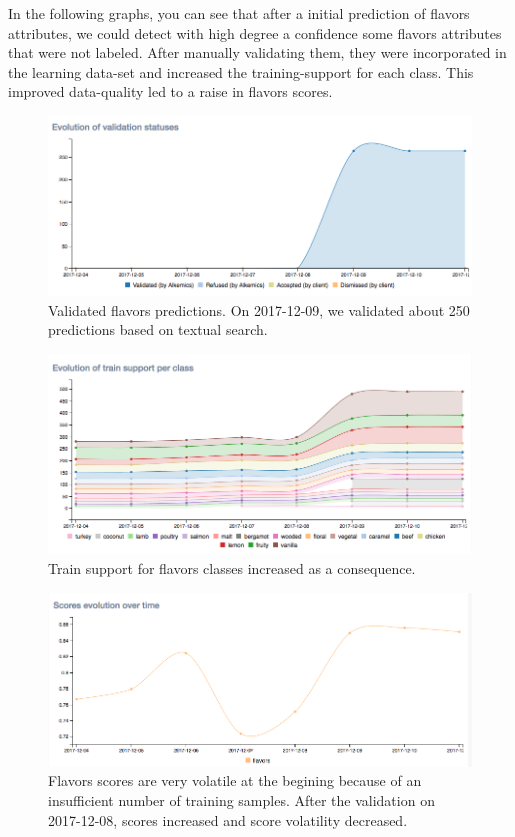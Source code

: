 In the following graphs, you can see that after a initial prediction of flavors attributes, we could detect with high degree a confidence some flavors attributes that were not labeled. After manually validating them, they were incorporated in the learning data-set and increased the training-support for each class. This improved data-quality led to a raise in flavors scores.

\begin{figure}[H]
\centering
\includegraphics[scale=0.5]{./images/incompletely-labeled/validation-flavors.png}
\caption{Validated flavors predictions. On 2017-12-09, we validated about 250 predictions based on textual search.}
\end{figure}


\begin{figure}[H]
\centering
\includegraphics[scale=0.5]{./images/incompletely-labeled/train-support-flavors.png}
\caption{Train support for flavors classes increased as a consequence.}
\end{figure}


\begin{figure}[H]
\centering
\includegraphics[scale=0.5]{./images/incompletely-labeled/scores-flavors.png}
\caption{Flavors scores are very volatile at the begining because of an insufficient number of training samples. After the validation on 2017-12-08, scores increased and score volatility decreased.}
\end{figure}


